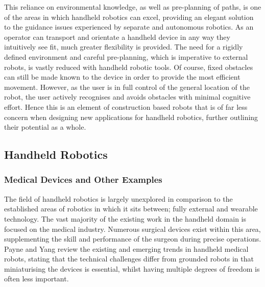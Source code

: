 \documentclass[11pt]{article}
\begin{document}
This reliance on environmental knowledge, as well as pre-planning of paths, is one of the areas in which handheld robotics can excel, providing an elegant solution to the guidance issues experienced by separate and autonomous robotics. As an operator can transport and orientate a handheld device in any way they intuitively see fit, much greater flexibility is provided. The need for a rigidly defined environment and careful pre-planning, which is imperative to external robots, is vastly reduced with handheld robotic tools. Of course, fixed obstacles can still be made known to the device in order to provide the most efficient movement. However, as the user is in full control of the general location of the robot, the user actively recognises and avoids obstacles with minimal cognitive effort. Hence this is an element of construction based robots that is of far less concern when designing new applications for handheld robotics, further outlining their potential as a whole. 

\pagebreak


\subsection{Handheld Robotics} \label{handheld}
\subsubsection{Medical Devices and Other Examples}
The field of handheld robotics is largely unexplored in comparison to the established areas of robotics in which it sits between; fully external and wearable technology. The vast majority of the existing work in the handheld domain is focused on the medical industry. Numerous surgical devices exist within this area, supplementing the skill and performance of the surgeon during precise operations. Payne and Yang \cite{Payne2014} review the existing and emerging trends in handheld medical robots, stating that the technical challenges differ from grounded robots in that miniaturising the devices is essential, whilst having multiple degrees of freedom is often less important.
\end{document}
